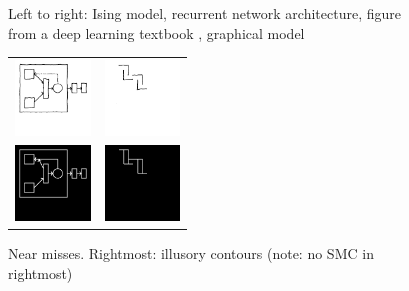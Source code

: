 \documentclass{article}
\theoremstyle{definition}
\begin{document}
\begin{figure}[H]
\begin{minipage}[t]{8.25cm}
\begin{tabular}{llll}
      \end{tabular}
    \caption{Left to right: Ising model, recurrent network architecture, figure from a deep learning textbook \cite{Goodfellow-et-al-2016}, graphical model}\label{drawingSuccesses}
  \end{minipage}
\hfill  \begin{minipage}[t]{4.25cm}
    \begin{tabular}{ll}
          \includegraphics[width = 2cm]{figures/expert-1.png}&
          \includegraphics[width = 2cm]{figures/expert-34.png}\\
      \includegraphics[width = 2cm]{figures/expert-1-parse.png}     &
              \includegraphics[width = 2cm]{figures/34-parse.png}    
    \end{tabular}


    \caption{Near misses. Rightmost: illusory contours (note: no SMC in rightmost)}\label{drawingFailures}
  \end{minipage}


\end{figure}
\setlength\tabcolsep{6pt}
\end{document}
